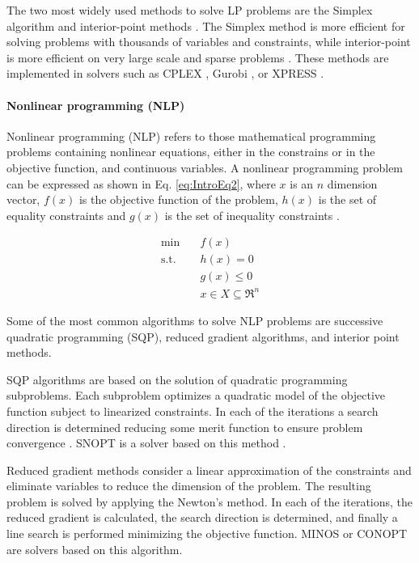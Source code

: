 \begin{refsection}[referencesCh1]
The two most widely used methods to solve LP problems are the Simplex algorithm \citep{murty1983linear} and interior-point methods \citep{POTRA2000281}. The Simplex method is more efficient for solving problems with thousands of variables and constraints, while interior-point
is more efficient on very large scale and sparse problems \citep{grossmann2021advanced}. These methods are implemented in solvers such as CPLEX \citep{cplex2009v12}, Gurobi \citep{gurobi}, or XPRESS \citep{xpress}.

\paragraph{Nonlinear programming (NLP)}
Nonlinear programming (NLP) refers to those mathematical programming problems containing nonlinear equations, either in the constrains or in the objective function, and continuous variables. A nonlinear programming problem can be expressed as shown in Eq.  \ref{eq:IntroEq2}, where $x$ is an $n$ dimension vector, $f(x)$ is the objective function of the problem, $h(x)$ is the set of equality constraints and $g(x)$ is the set of inequality constraints \citep{floudas1995nonlinear}.

\begin{align}
\label{eq:IntroEq2}
\min \quad & f(x) \nonumber\\
\textrm{s.t.} \quad & h(x)=0\\
& g(x) \leq 0 \nonumber\\
&x \in X  \subseteq \Re^{n} \nonumber
\end{align}

Some of the most common algorithms to solve NLP problems are successive quadratic programming (SQP), reduced gradient algorithms, and interior point methods. 

SQP algorithms are based on the solution of quadratic programming subproblems. Each subproblem optimizes a quadratic model of the objective function subject to linearized constraints. In each of the iterations a search direction is determined reducing some merit function to ensure problem convergence \citep{gill2005snopt}. SNOPT is a solver based on this method \citep{gill2005snopt}.

Reduced gradient methods consider a linear approximation of the constraints and eliminate variables to reduce the dimension of the problem. The resulting problem is solved by applying the Newton’s method. In each of the iterations, the reduced gradient is calculated, the search direction is determined, and finally a line search is performed minimizing the objective function. MINOS \citep{murtagh1983minos} or CONOPT \citep{drud1985conopt} are solvers based on this algorithm.


\end{refsection}
